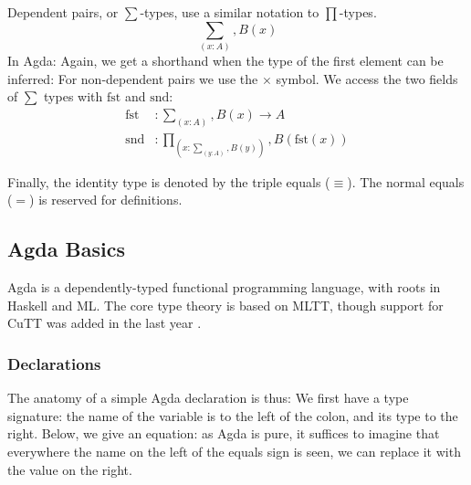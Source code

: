 \begin{subappendices}
Dependent pairs, or \(\sum\)-types, use a similar notation to \(\prod\)-types.
\begin{equation}
  \sum_{(x : A)} , B (x)
\end{equation}
In Agda:
Again, we get a shorthand when the type of the first element can be inferred:
For non-dependent pairs we use the \(\times\) symbol.
We access the two fields of \(\sum\) types with \(\text{fst}\) and
\(\text{snd}\):
\begin{align}
  \text{fst} &: \sum_{(x : A)} , B (x) \rightarrow A \\
  \text{snd} &: \prod_{(x : \sum_{(y : A)} , B (y))} , B (\text{fst}(x))
\end{align}

Finally, the identity type is denoted by the triple equals (\(\equiv\)).
The normal equals (\(=\)) is reserved for definitions.


\subsection{Agda Basics}
Agda \cite{norellDependentlyTypedProgramming2008} is a dependently-typed
functional programming language, with roots in Haskell and ML.
The core type theory is based on MLTT, though support for CuTT was added in the
last year \cite{vezzosiCubicalAgdaDependently2019}.
\subsubsection{Declarations}
The anatomy of a simple Agda declaration is thus:
We first have a type signature: the name of the variable is to the left of the
colon, and its type to the right.
Below, we give an equation: as Agda is pure, it suffices to imagine that
everywhere the name on the left of the equals sign is seen, we can replace it
with the value on the right.

\end{subappendices}
